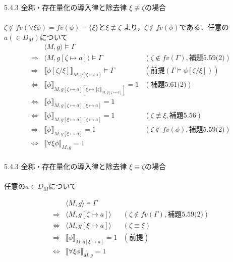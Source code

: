 \documentclass[dvipdfmx,11pt]{beamer}
\begin{document}
\begin{frame}{5.4.3 全称・存在量化の導入律と除去律}
  \(\xi\not\equiv\zeta\)の場合\\\mbox{}\\

  \(\zeta\notin\textit{fv}(\forall\xi\phi)=\textit{fv}(\phi)-\{\xi\}\)と\(\xi\not\equiv\zeta\)
  より，\(\zeta\notin\textit{fv}(\phi)\)である．任意の\(a(\in D_M)\)について
  \[
  \begin{array}{rll}
    & \langle M,g \rangle\vDash\Gamma & \\
    \Longrightarrow & \langle M,g[\zeta\mapsto a]\rangle\vDash\Gamma & (\zeta\notin\textit{fv}(\Gamma), \textit{補題5.59(2)}) \\
    \Longrightarrow & \llbracket\phi[\zeta/\xi]\rrbracket_{M,g[\zeta\mapsto a]} \vDash \Gamma & (\textit{前提}(\Gamma \vDash \phi [ \zeta / \xi ]))\\
    \iff & \llbracket\phi\rrbracket_{M,g[\zeta\mapsto a][\xi\mapsto \llbracket\zeta\rrbracket_{M,g[\zeta\mapsto a]}]} = 1 & (\textit{補題5.61(2)})\\
    \iff & \llbracket\phi\rrbracket_{M,g[\zeta\mapsto a][\xi\mapsto a]} = 1 & \\
    \iff & \llbracket\phi\rrbracket_{M,g[\xi\mapsto a][\zeta\mapsto a]} = 1 & (\zeta\not\equiv\xi,\textit{補題5.56}) \\
    \Longrightarrow & \llbracket\phi\rrbracket_{M,g[\xi\mapsto a]} = 1 & (\zeta\notin\textit{fv}(\phi),\textit{補題5.59(2)}) \\
    \iff & \llbracket\forall\xi\phi\rrbracket_{M,g} = 1 & \\
  \end{array}
  \]
\end{frame}

\begin{frame}{5.4.3 全称・存在量化の導入律と除去律}
  \(\xi\equiv\zeta\)の場合\\\mbox{}\\

  任意の\(a\in D_M\)について

  \[
  \begin{array}{rll}
    & \langle M,g \rangle \vDash \Gamma & \\
    \Longrightarrow & \langle M,g[\zeta\mapsto a] \rangle & (\zeta\notin\textit{fv}(\Gamma), \textit{補題5.59(2)}) \\
    \iff & \langle M,g[\xi\mapsto a] \rangle & (\zeta\equiv\xi) \\
    \Longrightarrow & \llbracket \phi \rrbracket_{M,g[\xi\mapsto a]} = 1 & (\textit{前提}) \\
    \iff & \llbracket\forall\xi\phi\rrbracket_{M,g} = 1 & \\
  \end{array}
  \]
\end{frame}
\end{document}

